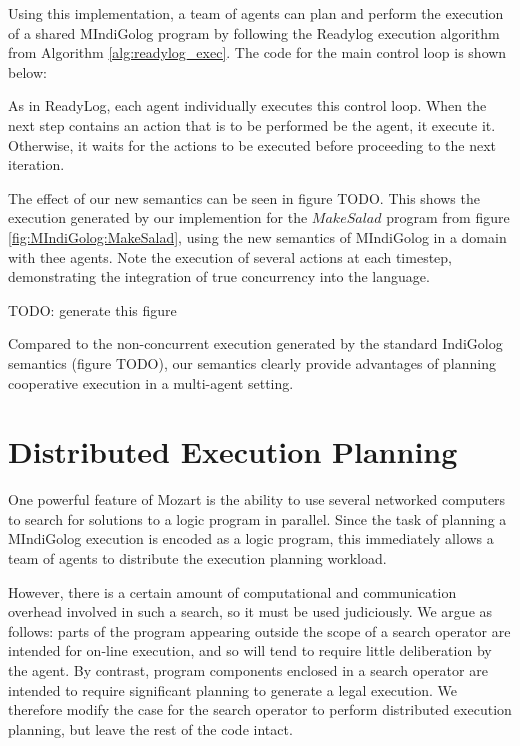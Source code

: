 Using this implementation, a team of agents can plan and perform the
execution of a shared MIndiGolog program by following the Readylog
execution algorithm from Algorithm \ref{alg:readylog_exec}. The code
for the main control loop is shown below:


As in ReadyLog, each agent individually executes this control loop.
When the next step contains an action that is to be performed be the
agent, it execute it. Otherwise, it waits for the actions to be executed
before proceeding to the next iteration. 

The effect of our new semantics can be seen in figure TODO. This shows
the execution generated by our implemention for the $MakeSalad$ program
from figure \ref{fig:MIndiGolog:MakeSalad}, using the new semantics
of MIndiGolog in a domain with thee agents. Note the execution of
several actions at each timestep, demonstrating the integration of
true concurrency into the language.

TODO: generate this figure

Compared to the non-concurrent execution generated by the standard
IndiGolog semantics (figure TODO), our semantics clearly provide advantages
of planning cooperative execution in a multi-agent setting.


\section{Distributed Execution Planning\label{sec:MIndiGolog:Distributed-Planning}}

One powerful feature of Mozart is the ability to use several networked
computers to search for solutions to a logic program in parallel.
Since the task of planning a MIndiGolog execution is encoded as a
logic program, this immediately allows a team of agents to distribute
the execution planning workload.

However, there is a certain amount of computational and communication
overhead involved in such a search, so it must be used judiciously.
We argue as follows: parts of the program appearing outside the scope
of a search operator are intended for on-line execution, and so will
tend to require little deliberation by the agent. By contrast, program
components enclosed in a search operator are intended to require significant
planning to generate a legal execution. We therefore modify the case
for the search operator to perform distributed execution planning,
but leave the rest of the code intact.

